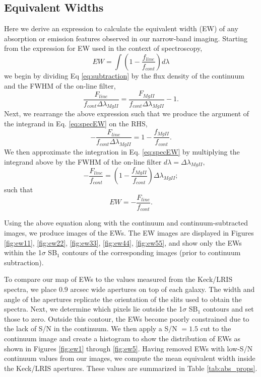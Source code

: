\documentclass[twocolumn]{aastex61}
\begin{document}
\subsection{Equivalent Widths}\label{subsec.ew}
Here we derive an expression to calculate the equivalent width (EW) of any absorption or emission features observed in our narrow-band imaging. Starting from the expression for EW used in the context of spectroscopy,
\begin{equation}
EW=\int (1-\frac{f_{line}}{f_{cont}})d\lambda
\label{eq:specEW}
\end{equation}
we begin by dividing Eq \ref{eq:subtraction} by the flux density of the continuum and the FWHM of the on-line filter,
\begin{equation}
\frac{F_{line}}{f_{cont}\Delta \lambda_{MgII}}=\frac{F_{MgII}}{f_{cont}\Delta \lambda_{MgII}}- 1.
\end{equation}
Next, we rearrange the above expression such that we produce the argument of the integrand in Eq. \ref{eq:specEW} on the RHS,
\begin{equation}
-\frac{F_{line}}{f_{cont}\Delta \lambda_{MgII}}=1-\frac{f_{MgII}}{f_{cont}}.
\end{equation}
We then approximate the integration in Eq. \ref{eq:specEW} by multiplying the integrand above by the FWHM of the on-line filter $d\lambda=\Delta \lambda_{MgII},$
\begin{equation}
-\frac{F_{line}}{f_{cont}}=(1-\frac{f_{MgII}}{f_{cont}})\Delta \lambda_{MgII};
\end{equation}
such that
\begin{equation}
EW=-\frac{F_{line}}{f_{cont}}.
\end{equation}

Using the above equation along with the continuum and continuum-subtracted images, we produce images of the EWs. The EW images are displayed in Figures \ref{fig:ew11}, \ref{fig:ew22}, \ref{fig:ew33}, \ref{fig:ew44}, \ref{fig:ew55}, and show only the EWs within the 1$\sigma$ SB$_1$ contours of the corresponding  images (prior to continuum subtraction). 

To compare our map of EWs to the values measured from the Keck/LRIS spectra, we place 0.9 arcsec wide apertures on top of each galaxy. The width and angle of the apertures replicate the orientation of the slits used to obtain the spectra. Next, we determine which pixels lie outside the 1$\sigma$ SB$_1$ contours and set those to zero. Outside this contour, the EWs become poorly constrained due to the lack of S/N in the continuum. We then apply a S/N $= 1.5$ cut to the continuum image and create a histogram to show the distribution of EWs as shown in Figures \ref{fig:ew1} through \ref{fig:ew5}. Having removed EWs with low-S/N continuum values from our images, we compute the mean equivalent width inside the Keck/LRIS apertures. These values are summarized in Table \ref{tab:abs_props}.
 
\end{document}
